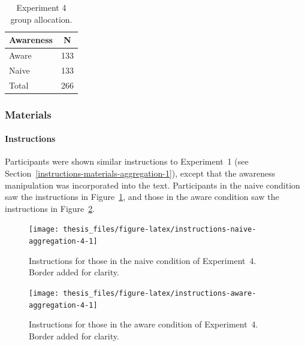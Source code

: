 \documentclass[a4paper, nobind, dvipsnames]{templates/ociamthesis}
\theoremstyle{definition}
\theoremstyle{definition}
\theoremstyle{definition}
\theoremstyle{definition}
\theoremstyle{remark}
\begin{document}
\begin{table}[tbp]

\begin{center}
\begin{threeparttable}

\caption{\label{tab:condition-allocation-aggregation-4}Experiment 4 group allocation.}

\begin{tabular}{ll}
\toprule
Awareness & \multicolumn{1}{c}{N}\\
\midrule
Aware & 133\\
Naive & 133\\
Total & 266\\
\bottomrule
\end{tabular}

\end{threeparttable}
\end{center}

\end{table}

\subsubsection{Materials}

\paragraph{Instructions}

Participants were shown similar instructions to Experiment~1 (see
Section~\ref{instructions-materials-aggregation-1}), except that the awareness
manipulation was incorporated into the text. Participants in the naive condition
saw the instructions in Figure~\ref{fig:instructions-naive-aggregation-4}, and
those in the aware condition saw the instructions in
Figure~\ref{fig:instructions-aware-aggregation-4}.



\begin{figure}
\texttt{[image: thesis\_files/figure-latex/instructions-naive-aggregation-4-1]} \caption{Instructions for those in the naive condition of Experiment~4. Border added for clarity.}\label{fig:instructions-naive-aggregation-4}
\end{figure}



\begin{figure}
\texttt{[image: thesis\_files/figure-latex/instructions-aware-aggregation-4-1]} \caption{Instructions for those in the aware condition of Experiment~4. Border added for clarity.}\label{fig:instructions-aware-aggregation-4}
\end{figure}
\end{document}
